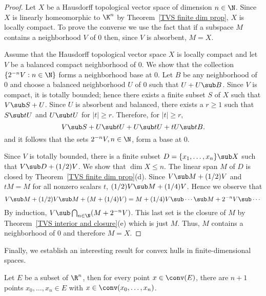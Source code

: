 \begin{proof}
Let $X$ be a Hausdorff topological vector space of dimension $n\in\N$. Since $X$ is linearly homeomorphic to $\K^n$ by Theorem~\ref{TVS finite dim prop}, $X$ is locally compact. To prove the converse we use the fact that if a subspace $M$ contains a neighborhood $V$ of $0$ then, since $V$ is absorbent, $M=X$.\par
Assume that the Hausdorff topological vector space $X$ is locally compact and let $V$ be a balanced compact neighborhood of $0$. We show that the collection $\{2^{-n}V:n\in\N\}$ forms a neighborhood base at $0$. Let $B$ be any neighborhood of $0$ and choose a balanced neighborhood $U$ of $0$ such that $U+U\sub B$. Since $V$ is compact, it is totally bounded; hence there exists a finite subset $S$ of $X$ such that $V\sub S+U$. Since $U$ is absorbent and balanced, there exists a $r\geq 1$ such that $S\sub tU$ and $U\sub tU$ for $|t|\geq r$. Therefore, for $|t|\geq r$,
\[V\sub S+U\sub tU+U\sub tU+tU\sub tB.\]
and it follows that the sets $2^{-n}V,n\in\N$, form a base at $0$.\par
Since $V$ is totally bounded, there is a finite subset $D=\{x_1,\dots,x_n\}\sub X$ such that $V\sub D+(1/2)V$. We show that $\dim X\leq n$. The linear span $M$ of $D$ is closed by Theorem~\ref{TVS finite dim prop}(d). Since $V\sub M+(1/2)V$ and $tM=M$ for all nonzero scalars $t$, $(1/2)V\sub M+(1/4)V$. Hence we observe that
\[V\sub M+(1/2)V\sub M+(M+(1/4)V)=M+(1/4)V\sub\cdots\sub M+2^{-n}V\sub\cdots\]
By induction, $V\sub\bigcap_{n\in\N}(M+2^{-n}V)$. This last set is the closure of $M$ by Theorem~\ref{TVS interior and closure}(e) which is just $M$. Thus, $M$ contains a neighborhood of $0$ and therefore $M=X$.
\end{proof}
Finally, we establish an interesting result for convex hulls in finite-dimensional spaces.
\begin{lemma}\label{Caratheodory theorem}
Let $E$ be a subset of $\R^n$, then for every point $x\in\conv(E)$, there are $n+1$ points $x_0,\dots,x_{n}\in E$ with $x\in\conv(x_0,\dots,x_n)$.
\end{lemma}
